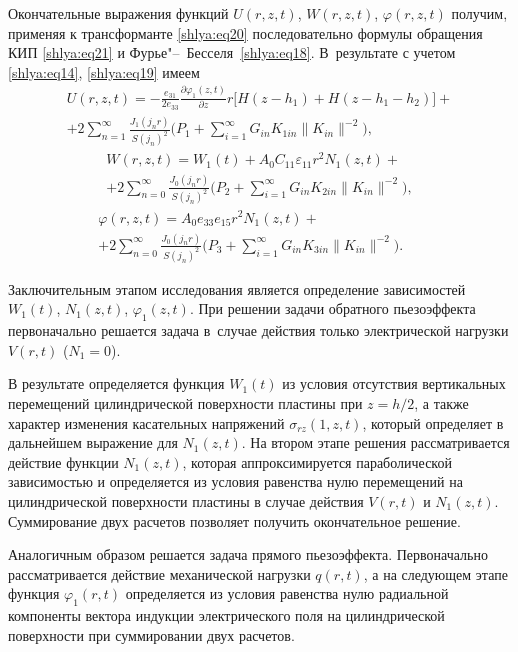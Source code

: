 Окончательные выражения функций $U(r,z,t)$, $W(r,z,t)$, $\varphi (r,z,t)$ получим, применяя к трансформанте 
\eqref{shlya:eq20} последовательно формулы обращения КИП \eqref{shlya:eq21} и Фурье"--~Бесселя~\eqref{shlya:eq18}. 
В~результате с учетом \eqref{shlya:eq14}, \eqref{shlya:eq19} имеем
\begin{multline}
U(r,z,t)=-\frac{e_{31} }{2e_{33} }\frac{\partial \varphi_1 (z,t)}{\partial z}r
\bigl[H(z-h_1)+H(z-h_1 -h_2 ) \bigr]+\\
+2\sum\limits_{n=1}^\infty 
\frac{J_1 (j_n r )}{S(j_n)^2} 
\biggl(P_1 +\sum\limits_{i=1}^\infty G_{in} K_{1in} \| K_{in} \|^{-2} \biggr),~~~~~~
\end{multline}
\begin{multline}
W(r,z,t)=W_1 ( t )+A_0 C_{11} \varepsilon _{11} 
r^2N_1 (z,t)+\\
+2\sum\limits_{n=0}^\infty \frac{J_0 (j_n r )}{S(j_n )^2} 
\biggl( P_2 +\sum\limits_{i=1}^\infty G_{in} K_{2in} \| K_{in} \|^{-2} \biggr),
\label{shlya:eq22}
\end{multline}
\begin{multline}
\varphi (r,z,t)=A_0 e_{33} e_{15} r^2N_1 (z,t) +\\ 
+2\sum\limits_{n=0}^\infty 
\frac{J_0 (j_n r)}{S(j_n )^2} 
\biggl(P_3 +\sum\limits_{i=1}^\infty
G_{in} K_{3in} \| K_{in} \|^{-2}  \biggr).~~~~~~
\end{multline}

Заключительным этапом исследования является определение зависимостей $W_1 ( t)$, $N_1 (z,t )$, $\varphi _1 (z,t )$. 
При  решении задачи обратного пьезоэффекта первоначально решается задача в~случае 
действия только электрической нагрузки $V(r,t)$ (${N_1 =0}$). 

В результате определяется функция $W_1 ( t )$ из условия 
отсутствия вертикальных перемещений цилиндрической поверхности пластины при 
$z=h/2$, а также характер изменения касательных напряжений $\sigma _{rz} 
(1,z,t)$, который определяет в дальнейшем выражение для $N_1 (z,t)$. На втором этапе решения рассматривается действие функции $N_1 
(z,t)$, которая аппроксимируется параболической зависимостью 
и определяется из условия равенства нулю перемещений на цилиндрической 
поверхности пластины в случае действия $V(r,t)$ и $N_1 (z,t)$. Суммирование двух расчетов позволяет получить окончательное 
решение.

Аналогичным образом решается задача прямого пьезоэффекта. Первоначально 
рассматривается действие механической нагрузки $q(r,t)$, а на следующем 
этапе функция $\varphi _1 (r,t)$ определяется из условия равенства нулю 
радиальной компоненты вектора индукции электрического поля на цилиндрической 
поверхности при суммировании двух расчетов.

